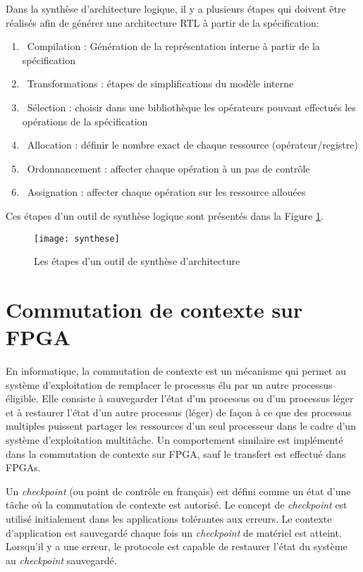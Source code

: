Dans la synthèse d'architecture logique, il y a plusieurs étapes qui doivent être réalisés afin de générer 
une architecture RTL à partir de la spécification:
\begin{enumerate}
	\item\ Compilation : Génération de la représentation interne à partir de la spécification
	\item\ Transformations : étapes de simplifications du modèle interne
	\item\ Sélection : choisir dans une bibliothèque les opérateurs pouvant effectués les opérations de la spécification
	\item\ Allocation : définir le nombre exact de chaque ressource (opérateur/registre)
	\item\ Ordonnancement : affecter chaque opération à un pas de contrôle
	\item\ Assignation : affecter chaque opération sur les ressource allouées
\end{enumerate}
Ces étapes d'un outil de synthèse logique sont présentés dans la Figure \ref{fig:synthese}.

\begin{figure}[h]
	\centering
	\texttt{[image: synthese]}
	\caption{Les étapes d'un outil de synthèse d'architecture}
	\label{fig:synthese}
	\vspace{-2mm}
\end{figure}

\section{Commutation de contexte sur FPGA}
\label{sec:contextswitch}

En informatique, la commutation de contexte est un mécanisme qui permet au système d'exploitation 
de remplacer le processus élu par un autre processus éligible. Elle consiste à sauvegarder l'état d'un processus
ou d'un processus léger et à restaurer l'état d'un autre processus (léger) de façon à ce que des processus
multiples puissent partager les ressources d'un seul processeur dans le cadre d'un système d'exploitation
multitâche\cite{technonet}. 
Un comportement similaire est implémenté dans la commutation de contexte sur FPGA, sauf le transfert
est effectué dans FPGAs.

Un \emph{checkpoint} (ou point de contrôle en français) est défini comme un état d'une tâche où la commutation de contexte est 
autorisé\cite{Bourge2015}. Le concept de \emph{checkpoint} est utilisé initialement dans les applications tolérantes aux erreurs. Le contexte
d'application est sauvegardé chaque fois un \emph{checkpoint} de matériel est atteint. Lorsqu'il y a une erreur, le protocole est capable de restaurer
l'état du système au \emph{checkpoint} sauvegardé.

